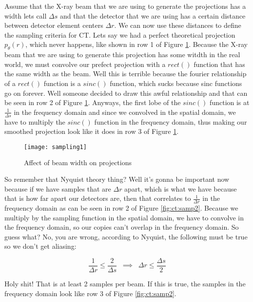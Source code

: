 Assume that the X-ray beam that we are using to generate the projections has a width lets call $\Delta s$ and that the detector that we are using has a certain distance between detector element centers $\Delta r$.  We can now use these distances to define the sampling criteria for CT. Lets say we had a perfect theoretical projection $p_{\theta}(r)$, which never happens, like shown in row 1 of Figure \ref{fig:ct:samp1}. Because the X-ray beam that we are using to generate this projection has some witdth in the real world, we must convolve our prefect projection with a $rect()$ function that has the same width as the beam. Well this is terrible because the fourier relationship of a $rect()$ function is a $sinc()$ function, which sucks because sinc functions go on forever. Well someone decided to draw this awful relationship and that can be seen in row 2 of Figure \ref{fig:ct:samp1}. Anyways, the first lobe of the $sinc()$ function is at $\frac{1}{\Delta s}$ in the frequency domain and since we convolved in the spatial domain, we have to multiply the $sinc()$ function in the frequency domain, thus making our smoothed projection look like it does in row 3 of Figure \ref{fig:ct:samp1}.

\begin{figure}[h]
	\centering
	\texttt{[image: sampling1]}
	\caption{Affect of beam width on projections}
	\label{fig:ct:samp1}
\end{figure}

So remember that Nyquist theory thing? Well it's gonna be important now because if we have samples that are $\Delta r$ apart, which is what we have because that is how far apart our detectors are, then that correlates to $\frac{1}{\Delta r}$ in the frequency domain as can be seen in row 2 of Figure \ref{fig:ct:samp2}. Because we multiply by the sampling function in the spatial domain, we have to convolve in the frequency domain, so our copies can't overlap in the frequency domain. So guess what? No, you are wrong, according to Nyquist, the following must be true so we don't get aliasing:

\begin{equation}
\frac{1}{\Delta r} \leq \frac{2}{\Delta s} \; \; \implies \; \; \Delta r \leq \frac{\Delta s}{2}
\end{equation}

\noindent
Holy shit! That is at least 2 samples per beam. If this is true, the samples in the frequency domain look like row 3 of Figure \ref{fig:ct:samp2}.

